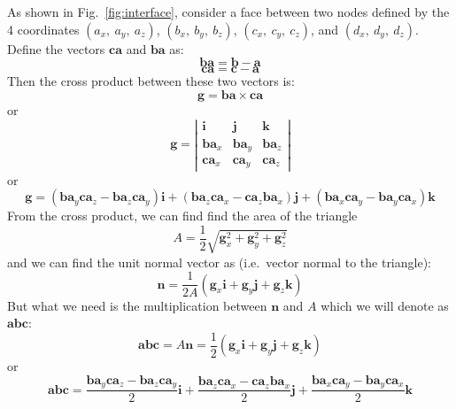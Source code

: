 \documentclass{warpdoc}
\renewcommand{\vec}[1]{\bm{#1}}
\begin{document}
As shown in Fig.\ \ref{fig:interface}, consider a face between two nodes defined by the 4 coordinates $(a_x,~a_y,~a_z)$, $(b_x,~b_y,~b_z)$, $(c_x,~c_y,~c_z)$, and $(d_x,~d_y,~d_z)$.  Define the vectors $\vec{ca}$ and $\vec{ba}$ as:
%
\begin{equation}
\vec{ba}=\vec{b}-\vec{a}
\end{equation}
%
%
\begin{equation}
\vec{ca}=\vec{c}-\vec{a}
\end{equation}
%
Then the cross product between these two vectors is:
%
\begin{equation}
\vec{g}=\vec{ba} \times \vec{ca}
\end{equation}
%
or
%
\begin{equation}
\vec{g}=\left|\begin{array}{ccc} 
\vec{i} & \vec{j} & \vec{k} \\
\vec{ba}_x & \vec{ba}_y & \vec{ba}_z \\
\vec{ca}_x & \vec{ca}_y & \vec{ca}_z 
\end{array}   \right|
\end{equation}
%
or
%
\begin{equation}
\vec{g}=
   (\vec{ba}_y \vec{ca}_z-  \vec{ba}_z \vec{ca}_y)\vec{i}
 + (\vec{ba}_z \vec{ca}_x - \vec{ca}_z \vec{ba}_x)\vec{j}
 + (\vec{ba}_x \vec{ca}_y - \vec{ba}_y \vec{ca}_x)\vec{k}
\end{equation}
%
From the cross product, we can find find the area of the triangle
%
\begin{equation}
A=\frac{1}{2}\sqrt{
   \vec{g}_x^2
 + \vec{g}_y^2
 + \vec{g}_z^2
  }
\end{equation}
%
and we can find the unit normal vector as (i.e.\ vector normal to the triangle):
%
\begin{equation}
\vec{n}=\frac{1}{2A}\left(\vec{g}_x\vec{i}+\vec{g}_y\vec{j} + \vec{g}_z\vec{k}\right)
\end{equation}
%
But what we need is the multiplication between $\vec{n}$ and $A$ which we will denote as $\vec{abc}$:
%
\begin{equation}
\vec{abc}=A\vec{n}=\frac{1}{2}\left(\vec{g}_x\vec{i}+\vec{g}_y\vec{j} + \vec{g}_z\vec{k}\right)
\end{equation}
%
or
%
\begin{equation}
\vec{abc}=\frac{\vec{ba}_y \vec{ca}_z-  \vec{ba}_z \vec{ca}_y}{2}\vec{i}+\frac{\vec{ba}_z \vec{ca}_x - \vec{ca}_z \vec{ba}_x}{2}\vec{j} + \frac{\vec{ba}_x \vec{ca}_y - \vec{ba}_y \vec{ca}_x}{2}\vec{k}
\end{equation}
%
\end{document}
